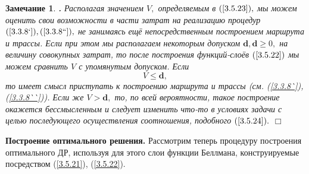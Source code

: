 \documentclass[11pt,twoside]{report}
\newcommand{\bfn}{\begin{equation}}
\newcommand{\efn}{\end{equation}}
\newcounter{theo}
\newcounter{zam}
\newtheorem{zam}{Замечание}[section]
\newcommand{\TL}{\mbox{\bf{$\!\!$.}}}
\begin{document}
{\begin{zam}\label{z3.5.1}{\TL} Располагая значением $V,$ определяемым в $(\ref{3.5.23}),$
мы можем оценить свои возможности в части затрат на реализацию процедур $(\ref{3.3.8`}),
(\ref{3.3.8``}),$ не занимаясь ещё непосредственным построением маршрута и трассы. Если при
этом мы располагаем некоторым допуском $\mathbf{d}, \mathbf{d}\geqslant 0,$ на величину
совокупных затрат, то после построения функций-слоёв $(\ref{3.5.22})$ мы можем сравнить $V$
с упомянутым допуском. Если
\bfn\label{3.5.24}V \leqslant \mathbf{d},
\efn
то имеет смысл приступать к построению маршрута и трассы (см. (\ref{3.3.8`}),
(\ref{3.3.8``})). Если же $V > \mathbf{d},$ то, по всей вероятности, такое построение
окажется бессмысленным и следует изменить что-то в условиях задачи с целью последующего
осуществления соотношения, подобного $(\ref{3.5.24}).$
\hfill $\Box$ \end{zam}

{\bf Построение оптимального решения.} Рассмотрим теперь процедуру построения оптимального
ДР, используя для этого слои функции Беллмана, конструируемые посредством (\ref{3.5.21}),
(\ref{3.5.22}).

}
\end{document}
